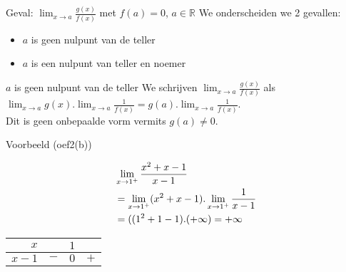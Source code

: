 \documentclass[handout]{beamer}
\begin{document}
\begin{frame}{Geval: $\displaystyle{\lim_{x \rightarrow a}}
\frac{g(x)}{f(x)}$ met $f(a) = 0$, $a \in \mathbb{R}$}
We onderscheiden we 2 gevallen:
\begin{itemize}
\item $a$ is geen nulpunt van de teller
\item $a$ is een nulpunt van teller en noemer
\end{itemize}
\begin{block}{$a$ is geen nulpunt van de teller}
We schrijven $\displaystyle{\lim_{x \rightarrow a}}
\frac{g(x)}{f(x)}$ als $\displaystyle{\lim_{x \rightarrow a}} g(x) .
\displaystyle{\lim_{x \rightarrow a}} \frac{1}{f(x)} = g(a) .
\displaystyle{\lim_{x \rightarrow a}} \frac{1}{f(x)}$.
\\Dit is geen onbepaalde vorm vermits $g(a) \neq 0$.
\end{block}
\end{frame}
\begin{frame}
\begin{exampleblock}{Voorbeeld (oef2(b))}

$$\aligned & \lim_{x  \to 1^+} \frac{x^2 + x - 1}{x-1} \\ & = \lim_{x  \to 1^+} (x^2+x-1) . \lim_{x  \to 1^+} \frac{1}{x-1} \\ & = ((1^2+1-1). (+ \infty) = + \infty \endaligned $$

\begin{center}
\begin{tabular}{r||c|c|c}$x$& &$ 1$& \\ \hline $x-1$ &
 $-$&$0$ &  $+$
\end{tabular}\end{center}
\end{exampleblock}
\end{frame}
\end{document}
